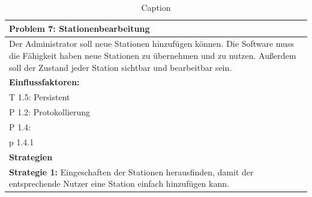\documentclass[enabledeprecatedfontcommands,fontsize=12pt,paper=a4,twoside]{scrartcl}
\begin{document}


\begin{table}[]

    \centering
    \begin{tabular}{|p{15cm}|}
    \hline
          \textbf{Problem 7:} Stationenbearbeitung
          \\ \hline
          Der Administrator soll neue Stationen hinzufügen können. Die Software muss die Fähigkeit haben neue Stationen zu übernehmen und zu nutzen. Außerdem soll der Zustand jeder Station sichtbar und bearbeitbar sein.
          \\ \hline
          \textbf{Einflussfaktoren: } \\
          T 1.5: Persistent \\
          P 1.2: Protokollierung\\
          P 1.4:\\
          p 1.4.1\\

          \hline
          \textbf{Strategien} \\ \hline
          \textbf{Strategie 1:} Eingeschaften der Stationen herausfinden, damit der entsprechende Nutzer eine Station einfach hinzufügen kann.
          \\ \hline
    \end{tabular}

    \caption{Caption}
    \label{tab:my_label}
\end{table}
\end{document}
